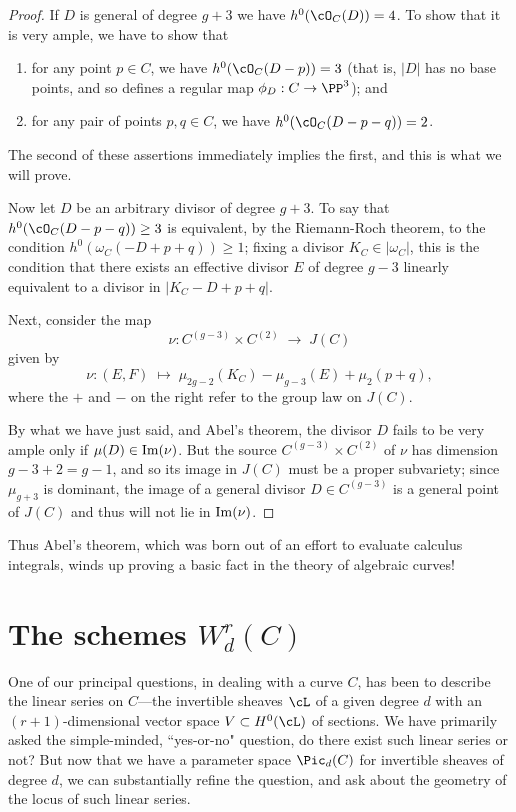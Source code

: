 \begin{proof}
If $D$ is general of degree $g+3$ we have $h^0(\cO_C(D)) = 4$. To show that it is very ample, we have to show that
\begin{enumerate}
\item for any point $p \in C$, we have $h^0(\cO_C(D-p)) = 3$ (that is, $|D|$ has no base points, and so defines a regular map $\phi_D : C \to \PP^3$); and
\item for any pair of points $p, q \in C$, we have $h^0(\cO_C(D-p-q)) = 2$.
\end{enumerate}
The second of these assertions immediately implies the first, and this is what we will prove.

Now let $D$ be an arbitrary divisor of degree $g+3$. To say that $h^0(\cO_C(D-p-q)) \geq 3$ is equivalent, by the Riemann-Roch theorem, to the condition $h^0(\omega_C(-D + p + q)) \geq 1$; fixing a divisor 
$K_{C}\in |\omega_{C}|$, this is the condition that there exists  
an effective divisor $E$ of degree $g-3$ linearly equivalent to a divisor in $|K_C - D + p + q|$. 

Next, consider the map 
$$
\nu : C^{(g-3)} \times C^{(2)} \; \to \; J(C)
$$
given by
$$
\nu : (E,F) \; \mapsto \; \mu_{2g-2}(K_C) - \mu_{g-3}(E) + \mu_{2}(p+q), 
$$
where the $+$ and $-$ on the right refer to the group law on $J(C)$. 

By what we have just said, and Abel's theorem, the divisor $D$ fails to be very ample only if
$\mu(D) \in {\rm Im}(\nu)$. But the source $C^{(g-3)} \times C^{(2)}$ of $\nu$ has dimension $g-3+2 = g-1$, and so its image in $J(C)$ must be a proper subvariety; since $\mu_{g+3}$ is dominant, the image of a general divisor $D \in C^{(g-3)}$ is a general point of $J(C)$ and thus will not lie in ${\rm Im}(\nu)$. 
\end{proof}

Thus Abel's theorem, which was born out of an effort to evaluate calculus integrals, winds up proving a basic fact in the theory of algebraic curves!  


\section{The schemes $W^r_d(C)$}

One of our principal questions, in dealing with a curve $C$, has been to describe the linear series on $C$---the invertible sheaves $\cL$ of a given degree $d$ with an $(r+1)$-dimensional  vector space $V \subset H^0(\cL)$ of sections. We have primarily asked the simple-minded, ``yes-or-no" question, do there exist such linear series or not? But now that we have a parameter space $\Pic_d(C)$ for invertible sheaves of degree $d$, we can substantially refine the question, and ask about the geometry of the locus of such linear series.

